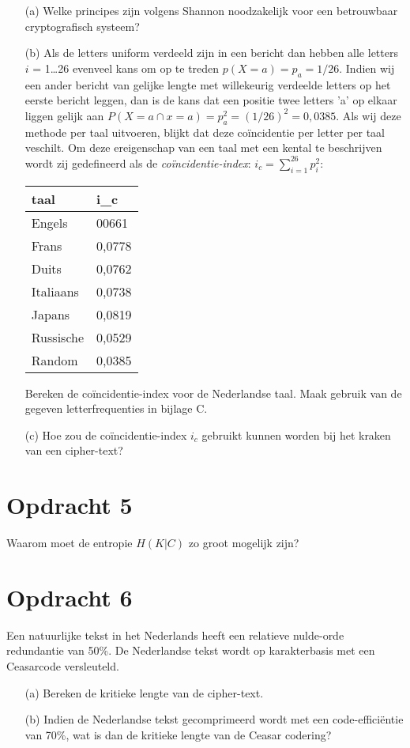 \begin{itemize}
  \item[(a)] Welke principes zijn volgens Shannon noodzakelijk voor een betrouwbaar cryptografisch systeem?
  \item[(b)] Als de letters uniform verdeeld zijn in een bericht dan hebben alle letters $i$ = 1\ldots26 evenveel kans om op te treden $p(X=a)=p_a=1/26$. Indien wij een ander bericht van gelijke lengte met willekeurig verdeelde letters op het eerste bericht leggen, dan is de kans dat een positie twee letters 'a' op elkaar liggen gelijk aan $P(X=a\cap x = a)=p_a^2=(1/26)^2=0,0385$. Als wij deze methode per taal uitvoeren, blijkt dat deze co\"{i}ncidentie per letter per taal veschilt. Om deze ereigenschap van een taal met een kental te beschrijven wordt zij gedefineerd als de \emph{co\"{i}ncidentie-index}: $i_c=\sum ^{26}_{i=1} p^2_i$:

\begin{center}
\begin{tabular}{ll}
  taal & i_c \\
  \hline
  Engels & 00661 \\ 
  Frans & 0,0778 \\
  Duits & 0,0762 \\
  Italiaans & 0,0738 \\
  Japans & 0,0819 \\
  Russische & 0,0529 \\
  Random & 0,0385 \\
\end{tabular}
\end{center}

Bereken de co\"{i}ncidentie-index voor de Nederlandse taal. Maak gebruik van de gegeven letterfrequenties in bijlage C.
   \item[(c)] Hoe zou de co\"{i}ncidentie-index $i_c$ gebruikt kunnen worden bij het kraken van een cipher-text?
\end{itemize}

\section{Opdracht 5}
Waarom moet de entropie $H(K|C)$ zo groot mogelijk zijn?

\section{Opdracht 6}
Een natuurlijke tekst in het Nederlands heeft een relatieve nulde-orde redundantie van 50\%. De Nederlandse tekst wordt op karakterbasis met een Ceasarcode versleuteld.
\begin{itemize}
  \item[(a)] Bereken de kritieke lengte van de cipher-text.
  \item[(b)] Indien de Nederlandse tekst gecomprimeerd wordt met een code-effici\"{e}ntie van 70\%, wat is dan de kritieke lengte van de Ceasar codering?
\end{itemize}
